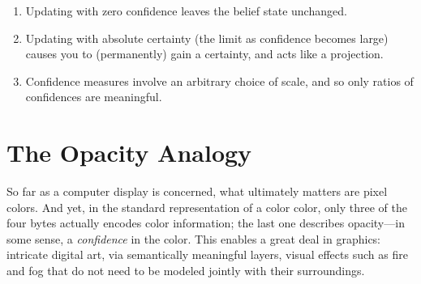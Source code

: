 \documentclass{article}
\begin{document}
\begin{enumerate}[nosep]
    \item Updating with zero confidence leaves the belief state unchanged.
    \item Updating with absolute certainty (the limit as confidence becomes large) causes you to (permanently) gain a certainty, and acts like a projection.
    \item Confidence measures involve an arbitrary choice of scale, and so only ratios of confidences are meaningful.
\end{enumerate}



\section{The Opacity Analogy}


    So far as a computer display is concerned, what ultimately matters are pixel colors.
    And yet, in the standard representation of a color color, only three of the four bytes actually encodes color information; the last one describes opacity---in some sense, a \emph{confidence} in the color.
    This enables a great deal in graphics: intricate digital art, via semantically meaningful layers,
        visual effects such as fire and fog that do not need to be modeled jointly with their surroundings.
\end{document}

